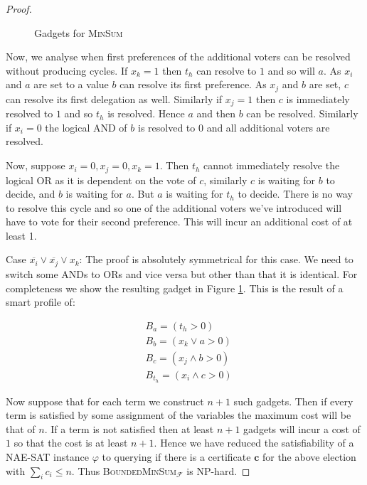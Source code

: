 \documentclass[11pt,a4paper, titlepage]{article}
\theoremstyle{definition}
\let\vec\mathbf
\begin{document}
\begin{proof}
\begin{figure}
{{
    }}
    \caption{Gadgets for \textsc{MinSum}}
    \label{fig:MinSum}
    \end{figure}
    
    Now, we analyse when first preferences of the additional voters can be resolved without producing cycles. 
    If $x_k = 1$ then $t_h$ can resolve to $1$ and so will $a$. As $x_i$ and $a$ are set to a value $b$ can resolve its first preference. 
    As $x_j$ and $b$ are set, $c$ can resolve its first delegation as well. 
    Similarly if $x_j = 1$ then $c$ is immediately resolved to $1$ and so $t_h$ is resolved. 
    Hence $a$ and then $b$ can be resolved. 
    Similarly if $x_i = 0$ the logical AND of $b$ is resolved to $0$ and all additional voters are resolved.
    
    Now, suppose $x_i = 0, x_j = 0, x_k = 1$. Then $t_h$ cannot immediately resolve the logical OR as it is dependent on the vote of $c$, similarly $c$ is waiting for $b$ to decide, and $b$ is waiting for $a$. But $a$ is waiting for $t_h$ to decide. There is no way to resolve this cycle and so one of the additional voters we've introduced will have to vote for their second preference. This will incur an additional cost of at least 1.

    Case $\overline{x_i} \lor \overline{x_j} \lor x_k$: The proof is absolutely symmetrical for this case. We need to switch some ANDs to ORs and vice versa but other than that it is identical. For completeness we show the resulting gadget in Figure \ref{fig:MinSum}. This is the result of a smart profile of:

    \begin{align*}
        &B_a = (t_h > 0) \\
        &B_b = (x_k \lor a > 0) \\
        &B_c = (x_j \land b > 0) \\
        &B_{t_h} = (x_i \land c > 0)
    \end{align*}

    Now suppose that for each term we construct $n + 1$ such gadgets. Then if every term is satisfied by some assignment of the variables the maximum cost will be that of $n$. If a term is not satisfied then at least $n+1$ gadgets will incur a cost of $1$ so that the cost is at least $n+1$. Hence we have reduced the satisfiability of a \textsc{NAE-SAT} instance $\varphi$ to querying if there is a certificate $\vec{c}$ for the above election with $\sum_{i} c_i \leq n$. Thus \textsc{BoundedMinSum}$_\mathcal{F}$ is NP-hard.
\end{proof}
\end{document}
